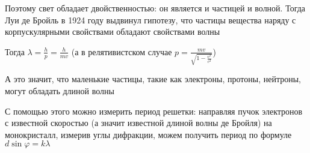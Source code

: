 Поэтому свет обладает двойственностью: он является и частицей и волной. Тогда Луи де Бройль в 1924 году выдвинул гипотезу, что частицы вещества наряду с корпускулярными свойствами обладают свойствами волны

Тогда $\lambda = \frac{h}{p} = \frac{h}{mv}$ (а в релятивистском случае $p = \frac{mv}{\sqrt{1 - \frac{v^2}{c^2}}}$)

А это значит, что маленькие частицы, такие как электроны, протоны, нейтроны, могут обладать длиной волны

С помощью этого можно измерить период решетки: направляя пучок электронов с известной скоростью (а значит известной длиной волны де Бройля) на монокристалл, измерив углы дифракции, можем получить период по формуле $d \sin \varphi = k \lambda$

